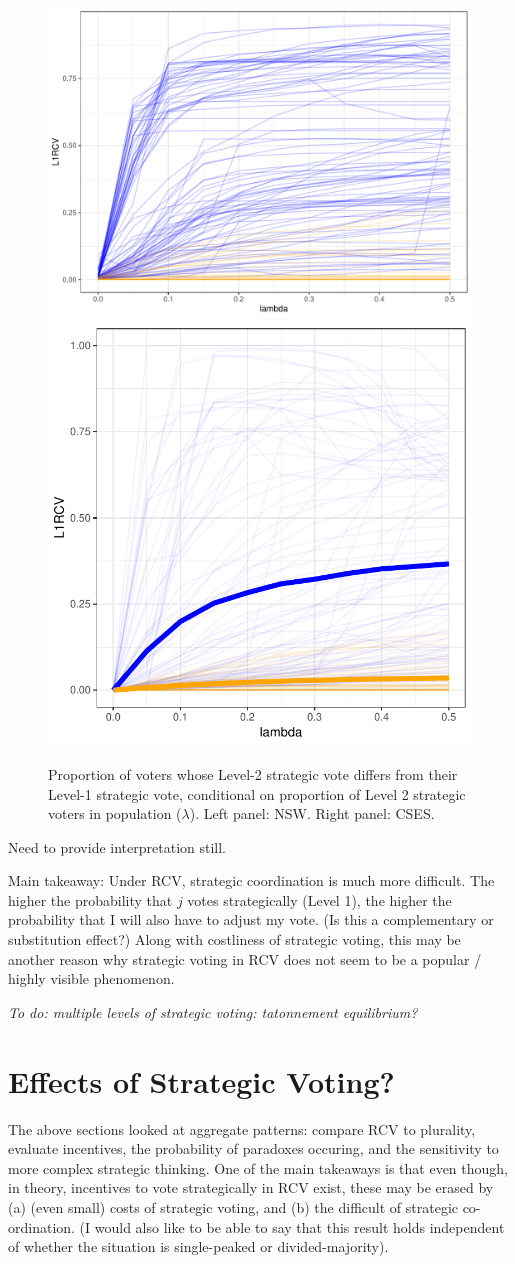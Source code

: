 \documentclass[11pt, letter, margin = 2 in]{article}
\begin{document}
\begin{figure}[!h]
	\centering
	\includegraphics[width = .45 \textwidth]{"../output/figures/level1_diff"}
	\includegraphics[width = .45 \textwidth]{"../output/figures/cses_l1"}
	\caption{Proportion of voters whose Level-2 strategic vote differs from their Level-1 strategic vote, conditional on proportion of Level 2 strategic voters in population ($\lambda$). Left panel: NSW. Right panel: CSES.}
	\label{fig:figure1}
\end{figure}

Need to provide interpretation still.

Main takeaway: Under RCV, strategic coordination is much more difficult. The higher the probability that $j$ votes strategically (Level 1), the higher the probability that I will also have to adjust my vote. (Is this a complementary or substitution effect?) Along with costliness of strategic voting, this may be another reason why strategic voting in RCV does not seem to be a popular / highly visible phenomenon.

\textit{To do: multiple levels of strategic voting: tatonnement equilibrium?}

\section{Effects of Strategic Voting?}

The above sections looked at aggregate patterns: compare RCV to plurality, evaluate incentives, the probability of paradoxes occuring, and the sensitivity to more complex strategic thinking. One of the main takeaways is that even though, in theory, incentives to vote strategically in RCV exist, these may be erased by (a) (even small) costs of strategic voting, and (b) the difficult of strategic co-ordination. (I would also like to be able to say that this result holds independent of whether the situation is single-peaked or divided-majority).
\end{document}
